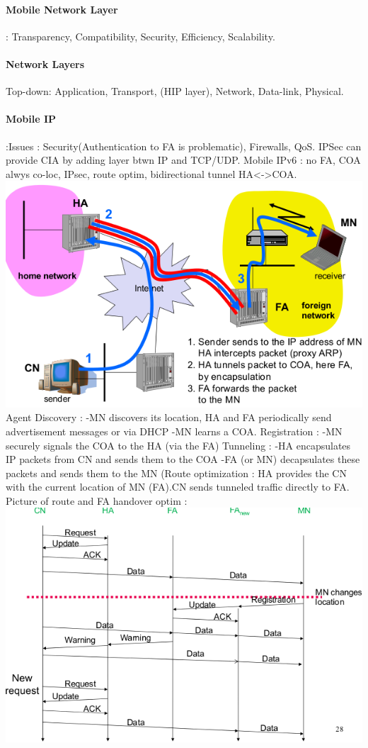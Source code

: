 \documentclass[6pt]{scrartcl}
\begin{document}
\begin{multicols}{4}
\paragraph{Mobile Network Layer}:
Transparency, Compatibility, Security, Efficiency, Scalability.
\paragraph{Network Layers} Top-down: Application, Transport, (HIP layer), Network, Data-link, Physical.
\paragraph{Mobile IP }:Issues : Security(Authentication to FA is problematic), Firewalls, QoS. IPSec can provide CIA by adding layer btwn IP and TCP/UDP. Mobile IPv6 : no FA, COA alwys co-loc, IPsec, route optim, bidirectional tunnel HA\textless -\textgreater COA.
\includegraphics[width=\columnwidth]{E1}
Agent Discovery :
-MN discovers its location, HA and FA periodically send advertisement messages or via DHCP
-MN learns a COA.
Registration :
-MN securely signals the COA to the HA (via the FA)
Tunneling :
-HA encapsulates IP packets from CN and sends them to the COA
-FA (or MN) decapsulates these packets and sends them to the MN
(Route optimization : HA provides the CN with the current location of MN (FA).CN sends tunneled traffic directly to FA. Picture of route and FA handover optim :
\includegraphics[width=\columnwidth]{E3}


\end{multicols}
\end{document}

